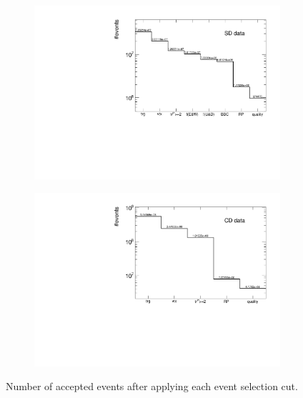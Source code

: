 \begin{figure}[H]
	\centering
	\parbox{0.484\textwidth}{
		\centering
		\begin{subfigure}[b]{\linewidth}{
				{\includegraphics[width=1.04\linewidth, page=1]{graphics/cutFlow/SDT.pdf}}}
		\end{subfigure}
	}
	\quad
	\parbox{0.484\textwidth}{
		\centering
		\begin{subfigure}[b]{\linewidth}{
				{\includegraphics[width=1.04\linewidth, page=1]{graphics/cutFlow/CPT2.pdf}}}
		\end{subfigure}
	}
	\caption[Number of accepted events  after applying each event selection cut]{Number of accepted events  after applying each event selection cut. }
	\label{fig:selectionCutFlow}
\end{figure}
